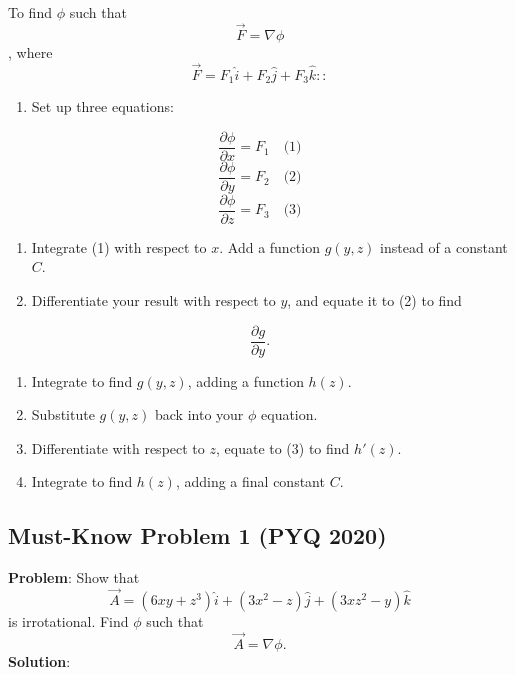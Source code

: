 \documentclass[
]{article}
\providecommand{\tightlist}{%
  \setlength{\itemsep}{0pt}\setlength{\parskip}{0pt}}
\begin{document}
To find \(\phi\) such that
\[
\vec{F} = \nabla\phi
\]
, where
\[
\vec{F} = F_1\hat{i} + F_2\hat{j} + F_3\hat{k}::
\]
\begin{enumerate}
\def\labelenumi{\arabic{enumi}.}
\tightlist
\item
  Set up three equations:
\end{enumerate}
\[
\frac{\partial\phi}{\partial x} = F_1 \quad \text{(1)}
\]
\[
\frac{\partial\phi}{\partial y} = F_2 \quad \text{(2)}
\]
\[
\frac{\partial\phi}{\partial z} = F_3 \quad \text{(3)}
\]
\begin{enumerate}
\def\labelenumi{\arabic{enumi}.}
\setcounter{enumi}{1}
\tightlist
\item
  Integrate (1) with respect to \(x\). Add a function \(g(y, z)\)
  instead of a constant \(C\).
\item
  Differentiate your result with respect to \(y\), and equate it to (2)
  to find
\end{enumerate}
\[
\frac{\partial g}{\partial y}.
\]
\begin{enumerate}
\def\labelenumi{\arabic{enumi}.}
\setcounter{enumi}{3}
\tightlist
\item
  Integrate to find \(g(y, z)\), adding a function \(h(z)\).
\item
  Substitute \(g(y, z)\) back into your \(\phi\) equation.
\item
  Differentiate with respect to \(z\), equate to (3) to find \(h'(z)\).
\item
  Integrate to find \(h(z)\), adding a final constant \(C\).
\end{enumerate}

\subsection{Must-Know Problem 1 (PYQ
2020)}\label{must-know-problem-1-pyq-2020}

\textbf{Problem}: Show that
\[
\vec{A} = (6xy + z^3)\hat{i} + (3x^2 - z)\hat{j} + (3xz^2 - y)\hat{k}
\]
is irrotational. Find \(\phi\) such that
\[
\vec{A} = \nabla\phi.
\]
\textbf{Solution}:
\end{document}
